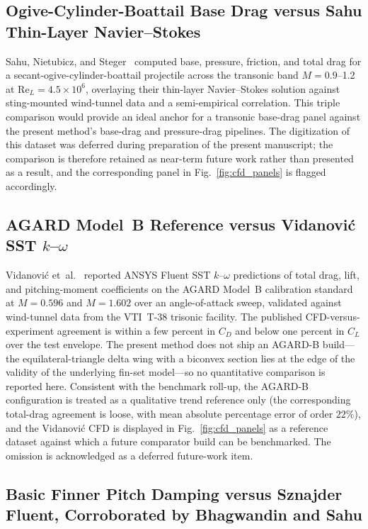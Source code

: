 \subsection{Ogive-Cylinder-Boattail Base Drag versus Sahu Thin-Layer Navier--Stokes}

Sahu, Nietubicz, and Steger~\cite{sahu1983} computed base, pressure, friction, and
total drag for a secant-ogive-cylinder-boattail projectile across the transonic
band $M = 0.9$--1.2 at $\mathrm{Re}_L = 4.5\times10^{6}$, overlaying their
thin-layer Navier--Stokes solution against sting-mounted wind-tunnel data and a
semi-empirical correlation. This triple comparison would provide an ideal anchor
for a transonic base-drag panel against the present method's base-drag and
pressure-drag pipelines. The digitization of this dataset was deferred during
preparation of the present manuscript; the comparison is therefore retained as
near-term future work rather than presented as a result, and the corresponding
panel in Fig.~\ref{fig:cfd_panels} is flagged accordingly.

\subsection{AGARD Model~B Reference versus Vidanovi\'c SST $k$--$\omega$}

Vidanovi\'c et~al.~\cite{vidanovic2014} reported ANSYS Fluent SST $k$--$\omega$
predictions of total drag, lift, and pitching-moment coefficients on the AGARD
Model~B calibration standard at $M = 0.596$ and $M = 1.602$ over an
angle-of-attack sweep, validated against wind-tunnel data from the VTI~T-38
trisonic facility. The published CFD-versus-experiment agreement is within a few
percent in $C_D$ and below one percent in $C_L$ over the test envelope. The present
method does not ship an AGARD-B build---the equilateral-triangle delta wing with a
biconvex section lies at the edge of the validity of the underlying fin-set
model---so no quantitative comparison is reported here. Consistent with the
benchmark roll-up, the AGARD-B configuration is treated as a qualitative trend
reference only (the corresponding total-drag agreement is loose, with mean absolute
percentage error of order $22\%$), and the Vidanovi\'c CFD is displayed in
Fig.~\ref{fig:cfd_panels} as a reference dataset against which a future comparator
build can be benchmarked. The omission is acknowledged as a deferred future-work
item.

\subsection{Basic Finner Pitch Damping versus Sznajder Fluent, Corroborated by Bhagwandin and Sahu}
\label{sec:cfd_cmq}

